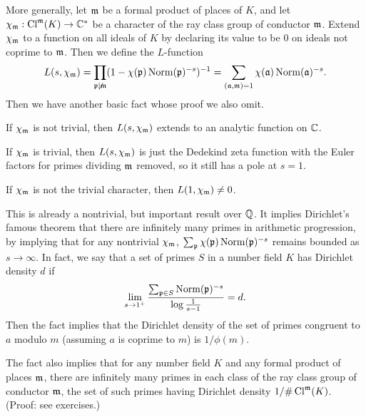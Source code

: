 More generally, let $\mathfrak{m}$ be a formal product of places of $K$,
and let $\chi_{\mathfrak{m}}: \operatorname{Cl}^{\mathfrak{m}}(K) \to \mathbb{C}^*$ be a character of the
ray class group of conductor $\mathfrak{m}$. Extend $\chi_{\mathfrak{m}}$ to a function
on all ideals of $K$ by declaring its value to be 0 on ideals not coprime
to $\mathfrak{m}$. Then we define the $L$-function
\[
L(s, \chi_{\mathfrak{m}}) = \prod_{\mathfrak{p} \not| \mathfrak{m}} (1 - \chi(\mathfrak{p}) \operatorname{Norm}(\mathfrak{p})^{-s})^{-1}
= \sum_{(\mathfrak{a}, \mathfrak{m}) = 1} \chi(\mathfrak{a}) \operatorname{Norm}(\mathfrak{a})^{-s}.
\]
Then we have another basic fact whose proof we also omit.
\begin{theorem} \label{T:analytic continuation}
If $\chi_{\mathfrak{m}}$ is not trivial, then
$L(s, \chi_{\mathfrak{m}})$ extends to an analytic function on $\mathbb{C}$.
\end{theorem}
If $\chi_{\mathfrak{m}}$ is trivial, then $L(s, \chi_{\mathfrak{m}})$ is just the Dedekind
zeta function with the Euler factors for primes dividing $\mathfrak{m}$ removed,
so it still has a pole at $s=1$. 

\begin{theorem} \label{T:nonvanishing of L}
If $\chi_{\mathfrak{m}}$ is not the trivial character, then
$L(1, \chi_{\mathfrak{m}}) \neq 0$.
\end{theorem}
This is already a nontrivial, but important result over $\mathbb{Q}$. It implies
Dirichlet's famous theorem that there are infinitely many primes in
arithmetic progression, by implying that for any nontrivial $\chi_{\mathfrak{m}}$,
$\sum_{\mathfrak{p}} \chi(\mathfrak{p}) \operatorname{Norm}(\mathfrak{p})^{-s}$ remains bounded as
$s \to \infty$. In fact, we say that a set of primes $S$ in a number field
$K$ has Dirichlet density $d$ if
\[
\lim_{s \to 1^+} \frac{\sum_{\mathfrak{p} \in S} \operatorname{Norm}(\mathfrak{p})^{-s}}{\log \frac{1}{s-1}} = d.
\]
Then the fact implies that the Dirichlet density of the
set of primes congruent to $a$ modulo $m$ (assuming $a$ is coprime to $m$)
is $1/\phi(m)$.

The fact also implies that for any number field $K$ and any formal
product of places $\mathfrak{m}$,
there are infinitely many primes in each
class of the ray class group of conductor $\mathfrak{m}$, the set of such 
primes having Dirichlet density
$1/\#\operatorname{Cl}^{\mathfrak{m}}(K)$. (Proof: see exercises.)

